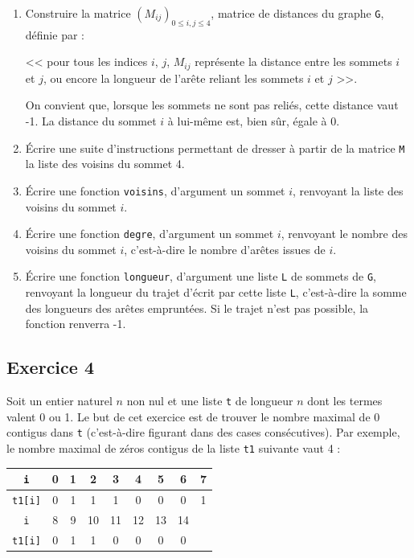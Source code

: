 \documentclass[10pt,fleqn]{article} %
\begin{document}
\begin{multicols}{2}
\begin{enumerate}
\item Construire la matrice $\left( M_{ij}\right)_{0\leq i,j\leq 4}$, matrice de distances du graphe \texttt{G}, définie par :

<< pour tous les indices $i$, $j$, $M_{ij}$ représente la distance entre les sommets $i$ et $j$,
ou encore la longueur de l’arête reliant les sommets $i$ et $j$ >>.

On convient que, lorsque les sommets ne sont pas reliés, cette distance vaut -1. La distance du
sommet $i$ à lui-même est, bien sûr, égale à 0.
\item Écrire une suite d'instructions permettant de dresser à partir de la matrice \texttt{M} la liste des voisins du sommet 4.
\item Écrire une fonction \texttt{voisins}, d’argument un sommet $i$, renvoyant la liste des voisins du sommet $i$.
\item Écrire une fonction \texttt{degre}, d’argument un sommet $i$, renvoyant le nombre des voisins du sommet $i$, c’est-à-dire le nombre d’arêtes issues de $i$.
\item Écrire une fonction \texttt{longueur}, d’argument une liste \texttt{L} de sommets de \texttt{G}, renvoyant la longueur du trajet d'écrit par cette liste \texttt{L}, c’est-à-dire la somme des longueurs des arêtes empruntées. Si le trajet n’est pas possible, la fonction renverra -1.
\end{enumerate}



\subsection*{Exercice 4}
Soit un entier naturel $n$ non nul et une liste \texttt{t} de longueur $n$ dont les termes valent 0 ou 1. Le but de cet exercice est de trouver le nombre maximal de 0 contigus dans \texttt{t} (c’est-à-dire figurant dans des cases consécutives). Par exemple, le nombre maximal de zéros contigus de la liste \texttt{t1} suivante vaut 4 :
\begin{center}
\begin{tabular}{|c|c|c|c|c|c|c|c|c|}
\hline 
\texttt{i} & 0 & 1 & 2 & 3 & 4 & 5 & 6 & 7 \\
\hline
\texttt{t1[i]} & 0 & 1 & 1 & 1 & 0 & 0 & 0 & 1 \\
\hline\hline
\texttt{i} & 8 & 9 & 10 & 11 & 12 & 13 & 14 \\
\cline{0-7} 
\texttt{t1[i]} & 0 & 1 & 1 & 0 & 0 & 0 & 0 \\
\cline{0-7}  
\end{tabular}
\end{center}


\end{multicols}
\end{document}
